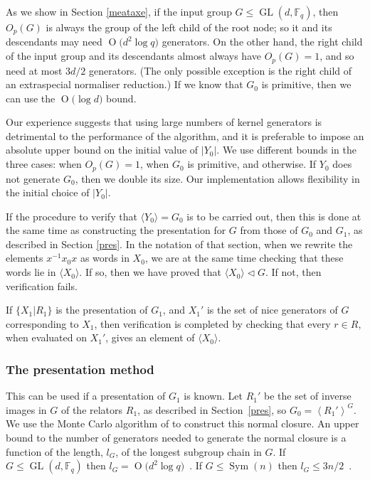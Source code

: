 \documentclass[12pt,twoside,reqno,psamsfonts]{amsproc}
\numberwithin{equation}{section}
\numberwithin{figure}{section}
\newcounter{algorithm}
\theoremstyle{plain}
\theoremstyle{definition}
\theoremstyle{remark}
\providecommand{\abs}[1]{\left\lvert #1 \right\rvert}
\providecommand{\gen}[1]{\left\langle #1 \right\rangle}
\providecommand{\Sym}[1]{\operatorname{Sym}( #1 )}
\newcommand{\field}[1]{\mathbb{#1}}
\newcommand{\F}{\field{F}}
\DeclareMathOperator{\GL}{GL}
\newcommand{\OR}[1]{\operatorname{O} \bigl( #1 \bigr)}
\begin{document}
As we show in Section \ref{meataxe}, if the input group
$G \leqslant \GL(d, \F_q)$, then $O_p(G)$ is always the group of the
left child of the root node;  so it 
and its descendants may need $\OR{d^2\log q}$ generators. 
On the other hand, the right child of the input group and its descendants
almost always have $O_p(G)=1$, and so need at most $3d/2$
generators. (The only possible exception is the right child of
an extraspecial normaliser reduction.)
If we know that $G_0$ is primitive, then we can use the $\OR{\log d}$ bound.

Our experience suggests that using large numbers of kernel
generators is detrimental to the performance of the algorithm,
and it is preferable to impose an absolute
upper bound on the initial value
of $\abs{Y_0}$.  We use different bounds in the three cases:
when $O_p(G)=1$, when $G_0$ is primitive, and otherwise.
If $Y_0$ does not generate $G_0$, then we double its size.
Our implementation allows flexibility in the initial
choice of $\abs{Y_0}$.

\vspace*{0.1cm} 
If the procedure to verify that $\langle Y_0 \rangle = G_0$
is to be carried out, then this is done
at the same time as constructing the presentation for $G$ from those of
$G_0$ and $G_1$, as described in Section \ref{pres}.
In the notation of that section, when we rewrite  
the elements $x^{-1}x_0x$ as words in $X_0$, we are at the same time
checking that these words lie in $\langle X_0 \rangle$.
If so, then we have proved that $\langle X_0 \rangle \triangleleft G$.
If not, then verification fails.

If $\{X_1 | R_1 \}$ is the presentation of $G_1$, and
$X_1'$ is the set of nice generators of $G$ corresponding
to $X_1$, then verification is completed by checking that
every $r\in R$, when evaluated on $X_1'$, gives an element
of $\langle X_0 \rangle $.

\subsubsection{The presentation method}
This can be used if a presentation of $G_1$ is known.
Let $R_1'$ be the set of inverse images in $G$ of the relators $R_1$,
as described in Section~\ref{pres}, so 
$G_0 = \gen{ R_1' }^G$. 
We use the Monte Carlo algorithm of \cite{MR1235795} to construct this
normal closure.  An upper bound to the number of generators needed
to generate the normal closure is a function of the 
length, $l_G$, of the longest subgroup chain in $G$.
If $G \leqslant \GL(d, \F_q)$ then $l_G = \OR{d^2 \log q}$~\cite{ST91}. 
If $G \leqslant \Sym{n}$ then $l_G \leqslant 3n/2$~\cite{CST89}.
\end{document}
